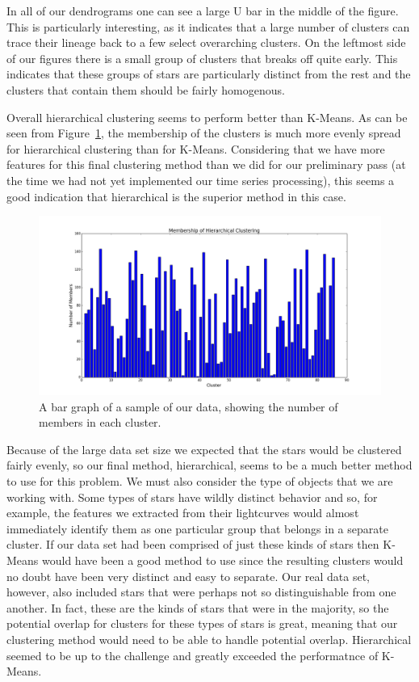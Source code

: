 \documentclass[12pt]{article}
\begin{document}
In all of our dendrograms one can see a large U bar in the middle of the figure.
This is particularly interesting, as it indicates that a large number of clusters can trace their lineage back to a few select overarching clusters.
On the leftmost side of our figures there is a small group of clusters that breaks off quite early.
This indicates that these groups of stars are particularly distinct from the rest and the clusters that contain them should be fairly homogenous. 

Overall hierarchical clustering seems to perform better than K-Means.
As can be seen from Figure~\ref{fig:Bar_Samp}, the membership of the clusters is much more evenly spread for hierarchical clustering than for K-Means.
Considering that we have more features for this final clustering method than we did for our preliminary pass (at the time we had not yet implemented our time series processing), this seems a good indication that hierarchical is the superior method in this case.

\begin{figure}
    \includegraphics[width=\textwidth]{bar_pop_samp.png}
    \caption{A bar graph of a sample of our data, showing the number of members in each cluster.}
    \label{fig:Bar_Samp}
    
\end{figure}


Because of the large data set size we expected that the stars would be clustered fairly evenly, so our final method, hierarchical, seems to be a much better method to use for this problem.
We must also consider the type of objects that we are working with.
Some types of stars have wildly distinct behavior and so, for example, the features we extracted from their lightcurves would almost immediately identify them as one particular group that belongs in a separate cluster.
If our data set had been comprised of just these kinds of stars then K-Means would have been a good method to use since the resulting clusters would no doubt have been very distinct and easy to separate.
Our real data set, however, also included stars that were perhaps not so distinguishable from one another.
In fact, these are the kinds of stars that were in the majority, so the potential overlap for clusters for these types of stars is great, meaning that our clustering method would need to be able to handle potential overlap.
Hierarchical seemed to be up to the challenge and greatly exceeded the performatnce of K-Means.
\end{document}

